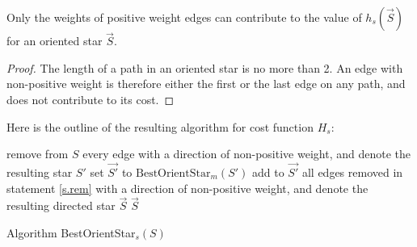  \begin{lemma}
  	Only the weights of positive weight edges can contribute to the value of $h_s(\vec{S})$ for an oriented star $\vec{S}$.
  \end{lemma} 
\begin{proof}
	The length of a path in an oriented star is no more than 2. 
	An edge with non-positive weight is therefore either the first or 
	the last edge on any path, and does not contribute to its cost. 
\end{proof}

Here is the outline of the resulting algorithm for cost function $H_s$:
 \begin{algorithm}\label{a.stars}
	 	\label{s.rem}
	remove from $S$ every edge with a direction of non-positive weight, and denote the resulting star $S'$
 \;
	set $\vec{S'}$ to $\mbox{BestOrientStar}_m (S')$\;
	add to $\vec{S'}$ all edges removed in statement \ref{s.rem} with a direction of non-positive weight,
	and denote the resulting directed star $\vec{S}$\;
	\Return $\vec{S}$\;
	\caption{Algorithm BestOrientStar$_s (S)$}
	\label{algo:oc-s}
\end{algorithm}
